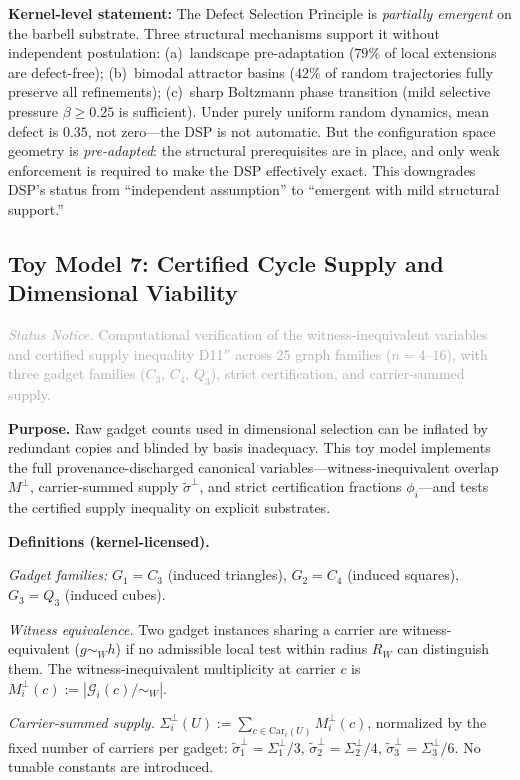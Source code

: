 \documentclass[11pt,a4paper]{article}
\theoremstyle{definition}
\theoremstyle{remark}
\newcommand{\statusnotice}[1]{%
  \medskip\noindent\textcolor{darkgray}{\textit{Status Notice.} #1}\medskip
}
\begin{document}
\textbf{Kernel-level statement:} The Defect Selection Principle is \emph{partially emergent} on the barbell substrate. Three structural mechanisms support it without independent postulation: (a)~landscape pre-adaptation ($79\%$ of local extensions are defect-free); (b)~bimodal attractor basins ($42\%$ of random trajectories fully preserve all refinements); (c)~sharp Boltzmann phase transition (mild selective pressure $\beta \geq 0.25$ is sufficient). Under purely uniform random dynamics, mean defect is $0.35$, not zero---the DSP is not automatic. But the configuration space geometry is \emph{pre-adapted}: the structural prerequisites are in place, and only weak enforcement is required to make the DSP effectively exact. This downgrades DSP's status from ``independent assumption'' to ``emergent with mild structural support.''


\subsection{Toy Model 7: Certified Cycle Supply and Dimensional Viability}\label{app:toymodel7}

\statusnotice{Computational verification of the witness-inequivalent variables and certified supply inequality D11$''$ across 25 graph families ($n = 4$--$16$), with three gadget families ($C_3$, $C_4$, $Q_3$), strict certification, and carrier-summed supply.}

\textbf{Purpose.} Raw gadget counts used in dimensional selection can be inflated by redundant copies and blinded by basis inadequacy. This toy model implements the full provenance-discharged canonical variables---witness-inequivalent overlap $M^\perp$, carrier-summed supply $\tilde\sigma^\perp$, and strict certification fractions $\phi_i$---and tests the certified supply inequality on explicit substrates.

\textbf{Definitions (kernel-licensed).}

\emph{Gadget families:} $G_1 = C_3$ (induced triangles), $G_2 = C_4$ (induced squares), $G_3 = Q_3$ (induced cubes).

\emph{Witness equivalence.} Two gadget instances sharing a carrier are witness-equivalent ($g \sim_W h$) if no admissible local test within radius $R_W$ can distinguish them. The witness-inequivalent multiplicity at carrier $c$ is $M_i^\perp(c) := |\mathcal{G}_i(c)/{\sim_W}|$.

\emph{Carrier-summed supply.} $\Sigma_i^\perp(U) := \sum_{c \in \mathrm{Car}_i(U)} M_i^\perp(c)$, normalized by the fixed number of carriers per gadget: $\tilde\sigma_1^\perp = \Sigma_1^\perp / 3$, $\tilde\sigma_2^\perp = \Sigma_2^\perp / 4$, $\tilde\sigma_3^\perp = \Sigma_3^\perp / 6$. No tunable constants are introduced.
\end{document}
